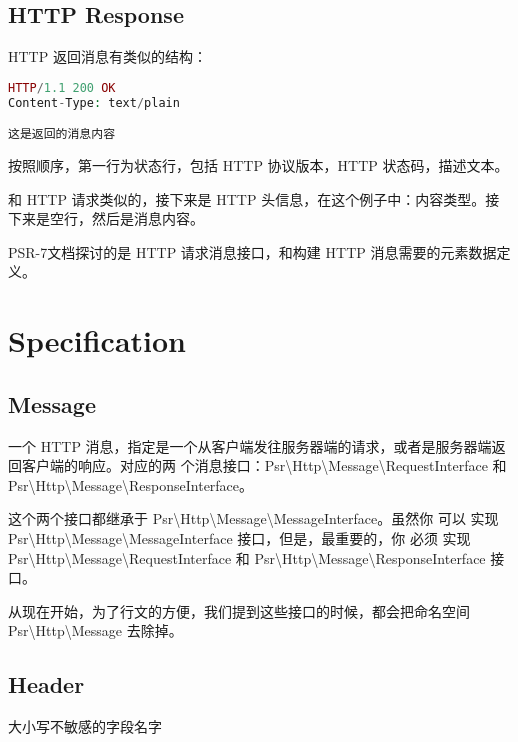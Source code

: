 \subsection{HTTP Response}

HTTP 返回消息有类似的结构：



\begin{lstlisting}[language=PHP]
HTTP/1.1 200 OK
Content-Type: text/plain

这是返回的消息内容
\end{lstlisting}

按照顺序，第一行为状态行，包括 HTTP 协议版本，HTTP 状态码，描述文本。

和 HTTP 请求类似的，接下来是 HTTP 头信息，在这个例子中：内容类型。接下来是空行，然后是消息内容。

PSR-7文档探讨的是 HTTP 请求消息接口，和构建 HTTP 消息需要的元素数据定义。

\section{Specification}



\subsection{Message}

一个 HTTP 消息，指定是一个从客户端发往服务器端的请求，或者是服务器端返回客户端的响应。对应的两 个消息接口：Psr\textbackslash Http\textbackslash Message\textbackslash RequestInterface 和 Psr\textbackslash Http\textbackslash Message\textbackslash ResponseInterface。

这个两个接口都继承于 Psr\textbackslash Http\textbackslash Message\textbackslash MessageInterface。虽然你 可以 实现 Psr\textbackslash Http\textbackslash Message\textbackslash MessageInterface 接口，但是，最重要的，你 必须 实现 Psr\textbackslash Http\textbackslash Message\textbackslash RequestInterface 和 Psr\textbackslash Http\textbackslash Message\textbackslash ResponseInterface 接口。

从现在开始，为了行文的方便，我们提到这些接口的时候，都会把命名空间 Psr\textbackslash Http\textbackslash Message 去除掉。

\subsection{Header}

大小写不敏感的字段名字

